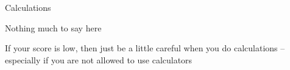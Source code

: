 \documentclass[14pt,fleqn]{extarticle}
\begin{document}
Calculations
%

\newcard

Nothing much to say here \newline 

If your score is low, then just be a little careful when you do calculations -- especially if you are not allowed to use calculators \newline 
\end{document}

